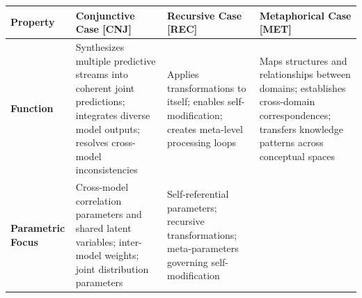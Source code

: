 \documentclass[
  11pt,
  letterpaper,
]{article}
\begin{document}
\begin{longtable}[]{@{}llll@{}}
\toprule
\begin{minipage}[b]{0.11\columnwidth}\raggedright
Property\strut
\end{minipage} & \begin{minipage}[b]{0.26\columnwidth}\raggedright
Conjunctive Case {[}CNJ{]}\strut
\end{minipage} & \begin{minipage}[b]{0.24\columnwidth}\raggedright
Recursive Case {[}REC{]}\strut
\end{minipage} & \begin{minipage}[b]{0.27\columnwidth}\raggedright
Metaphorical Case {[}MET{]}\strut
\end{minipage}\tabularnewline
\midrule
\endhead
\begin{minipage}[t]{0.11\columnwidth}\raggedright
\textbf{Function}\strut
\end{minipage} & \begin{minipage}[t]{0.26\columnwidth}\raggedright
Synthesizes multiple predictive streams into coherent joint predictions;
integrates diverse model outputs; resolves cross-model
inconsistencies\strut
\end{minipage} & \begin{minipage}[t]{0.24\columnwidth}\raggedright
Applies transformations to itself; enables self-modification; creates
meta-level processing loops\strut
\end{minipage} & \begin{minipage}[t]{0.27\columnwidth}\raggedright
Maps structures and relationships between domains; establishes
cross-domain correspondences; transfers knowledge patterns across
conceptual spaces\strut
\end{minipage}\tabularnewline
\begin{minipage}[t]{0.11\columnwidth}\raggedright
\textbf{Parametric Focus}\strut
\end{minipage} & \begin{minipage}[t]{0.26\columnwidth}\raggedright
Cross-model correlation parameters and shared latent variables;
inter-model weights; joint distribution parameters\strut
\end{minipage} & \begin{minipage}[t]{0.24\columnwidth}\raggedright
Self-referential parameters; recursive transformations; meta-parameters
governing self-modification\strut
\end{minipage} & \begin{minipage}[t]{0.27\columnwidth}\raggedright

\end{minipage}
\end{longtable}
\end{document}
